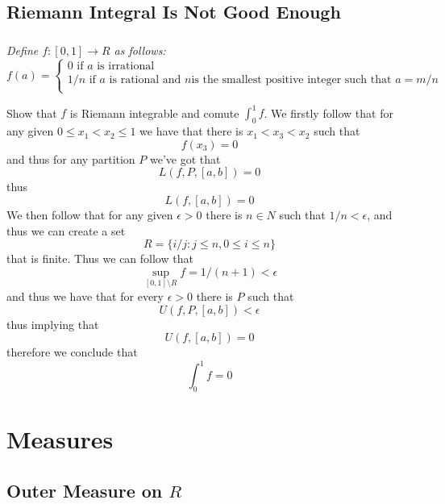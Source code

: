 \documentclass[11pt,oneside,titlepage]{book}
\newcommand{\set}[1]{\{ #1 \}}
\begin{document}
\section{Riemann Integral Is Not Good Enough}

\subsection{}

\textit{Define $f: [0, 1] \to R$ as follows:
$$ f(a) = 
\begin{cases}
  0 \text{ if } a \text{ is irrational} \\
  1/n \text{ if } a \text{ is rational and } n \text{
  is the smallest positive integer such that } a = m/n \\
\end{cases}
$$}

Show that $f$ is Riemann integrable and comute $\int_0^1{f}$. We
firstly follow that for any given $0 \leq x_1 < x_2 \leq 1$ we have that
there is $x_1 < x_3 < x_2$ such that
$$f(x_3) = 0$$
and thus for any partition $P$ we've got that
$$L(f, P, [a, b]) = 0$$
thus
$$L(f, [a, b]) = 0$$
We then follow that for any given $\epsilon > 0$ there is $n \in N$
such that $1/n < \epsilon$, and thus we can create a set
$$R = \set{i/j: j \leq n, 0 \leq i \leq n}$$
that is finite. Thus we can follow that
$$\sup_{[0, 1] \setminus R}{f} = 1/(n + 1) < \epsilon$$
and thus we have that for every $\epsilon > 0$ there is $P$ such that
$$U(f, P, [a, b]) < \epsilon$$
thus implying that
$$U(f, [a, b]) = 0$$
therefore we conclude that
$$\int_0^1{f} = 0$$

\chapter{Measures}

\section{Outer Measure on $R$}
\end{document}

